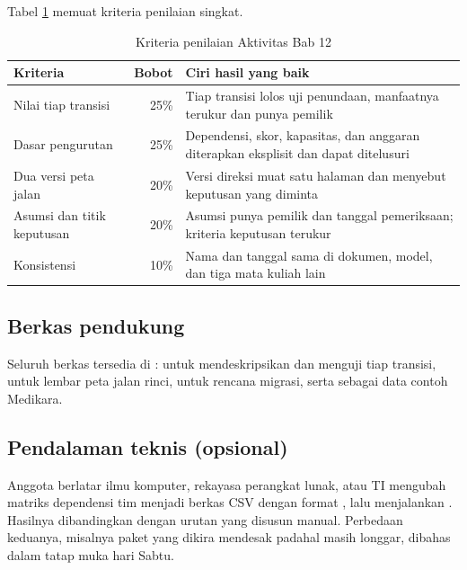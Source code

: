 Tabel \ref{tab:ch12-penilaian} memuat kriteria penilaian singkat.

\begin{table}[!htb]
  \centering
  \caption{Kriteria penilaian Aktivitas Bab 12}
  \label{tab:ch12-penilaian}
  \begin{tabularx}{\textwidth}{>{\raggedright\arraybackslash}p{3.4cm}
                               r>{\raggedright\arraybackslash}X}
    \hline
    \textbf{Kriteria} & \textbf{Bobot} & \textbf{Ciri hasil yang baik} \\
    \hline
    Nilai tiap transisi & 25\% & Tiap transisi lolos uji penundaan, manfaatnya
      terukur dan punya pemilik \\
    \hline
    Dasar pengurutan & 25\% & Dependensi, skor, kapasitas, dan anggaran
      diterapkan eksplisit dan dapat ditelusuri \\
    \hline
    Dua versi peta jalan & 20\% & Versi direksi muat satu halaman dan menyebut
      keputusan yang diminta \\
    \hline
    Asumsi dan titik keputusan & 20\% & Asumsi punya pemilik dan tanggal
      pemeriksaan; kriteria keputusan terukur \\
    \hline
    Konsistensi & 10\% & Nama dan tanggal sama di dokumen, model, dan tiga mata
      kuliah lain \\
    \hline
  \end{tabularx}
\end{table}

\subsection*{Berkas pendukung}

Seluruh berkas tersedia di :
 untuk mendeskripsikan dan menguji tiap
transisi,  untuk lembar peta jalan rinci,
 untuk rencana migrasi, serta
 sebagai data contoh Medikara.

\subsection*{Pendalaman teknis (opsional)}

Anggota berlatar ilmu komputer, rekayasa perangkat lunak, atau TI mengubah
matriks dependensi tim menjadi berkas CSV dengan format
, lalu menjalankan
. Hasilnya dibandingkan dengan
urutan yang disusun manual. Perbedaan keduanya, misalnya paket yang dikira
mendesak padahal masih longgar, dibahas dalam tatap muka hari Sabtu.

